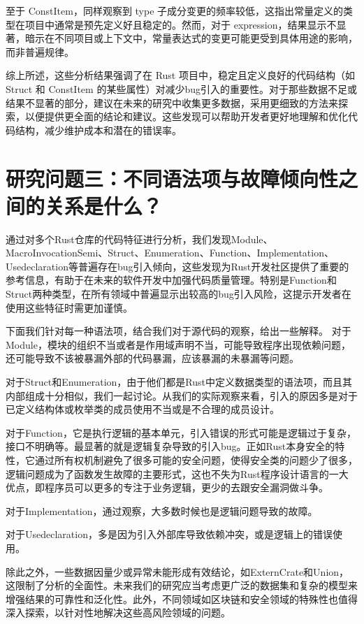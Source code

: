 至于 ConstItem，同样观察到 type 子成分变更的频率较低，这指出常量定义的类型在项目中通常是预先定义好且稳定的。然而，对于 expression，结果显示不显著，暗示在不同项目或上下文中，常量表达式的变更可能更受到具体用途的影响，而非普遍规律。

综上所述，这些分析结果强调了在 Rust 项目中，稳定且定义良好的代码结构（如 Struct 和 ConstItem 的某些属性）对减少bug引入的重要性。对于那些数据不足或结果不显著的部分，建议在未来的研究中收集更多数据，采用更细致的方法来探索，以便提供更全面的结论和建议。这些发现可以帮助开发者更好地理解和优化代码结构，减少维护成本和潜在的错误率。
\section{研究问题三：不同语法项与故障倾向性之间的关系是什么？}
通过对多个Rust仓库的代码特征进行分析，我们发现Module、MacroInvocationSemi、Struct、Enumeration、Function、Implementation、Usedeclaration等普遍存在bug引入倾向，这些发现为Rust开发社区提供了重要的参考信息，有助于在未来的软件开发中加强代码质量管理。特别是Function和Struct两种类型，在所有领域中普遍显示出较高的bug引入风险，这提示开发者在使用这些特征时需更加谨慎。

下面我们针对每一种语法项，结合我们对于源代码的观察，给出一些解释。
对于Module，模块的组织不当或者是作用域声明不当，可能导致程序出现依赖问题，还可能导致不该被暴漏外部的代码暴漏，应该暴漏的未暴漏等问题。

对于Struct和Enumeration，由于他们都是Rust中定义数据类型的语法项，而且其内部组成十分相似，我们一起讨论。从我们的实际观察来看，引入的原因多是对于已定义结构体或枚举类的成员使用不当或是不合理的成员设计。

对于Function，它是执行逻辑的基本单元，引入错误的形式可能是逻辑过于复杂，接口不明确等。最显著的就是逻辑复杂导致的引入bug。正如Rust本身安全的特性，它通过所有权机制避免了很多可能的安全问题，使得安全类的问题少了很多，逻辑问题成为了函数发生故障的主要形式，这也不失为Rust程序设计语言的一大优点，即程序员可以更多的专注于业务逻辑，更少的去跟安全漏洞做斗争。

对于Implementation，通过观察，大多数时候也是逻辑问题导致的故障。

对于Usedeclaration，多是因为引入外部库导致依赖冲突，或是逻辑上的错误使用。

除此之外，一些数据因量少或异常未能形成有效结论，如ExternCrate和Union，这限制了分析的全面性。未来我们的研究应当考虑更广泛的数据集和复杂的模型来增强结果的可靠性和泛化性。此外，不同领域如区块链和安全领域的特殊性也值得深入探索，以针对性地解决这些高风险领域的问题。

